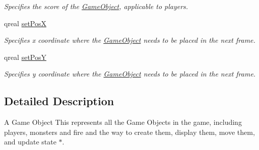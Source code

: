 \begin{DoxyCompactItemize}
\begin{DoxyCompactList}\small\item\em Specifies the score of the \hyperlink{classGameObject}{Game\-Object}, applicable to players. \end{DoxyCompactList}\item 
\hypertarget{classGameObject_a80707284fe2dfb659cbf6d5602033fc4}{qreal \hyperlink{classGameObject_a80707284fe2dfb659cbf6d5602033fc4}{set\-Pos\-X}}\label{classGameObject_a80707284fe2dfb659cbf6d5602033fc4}

\begin{DoxyCompactList}\small\item\em Specifies x coordinate where the \hyperlink{classGameObject}{Game\-Object} needs to be placed in the next frame. \end{DoxyCompactList}\item 
\hypertarget{classGameObject_a3fb32317c043ba8cc2dc4744d5ff463a}{qreal \hyperlink{classGameObject_a3fb32317c043ba8cc2dc4744d5ff463a}{set\-Pos\-Y}}\label{classGameObject_a3fb32317c043ba8cc2dc4744d5ff463a}

\begin{DoxyCompactList}\small\item\em Specifies y coordinate where the \hyperlink{classGameObject}{Game\-Object} needs to be placed in the next frame. \end{DoxyCompactList}\end{DoxyCompactItemize}


\subsection{Detailed Description}
A Game Object This represents all the Game Objects in the game, including players, monsters and fire and the way to create them, display them, move them, and update state $\ast$. 

